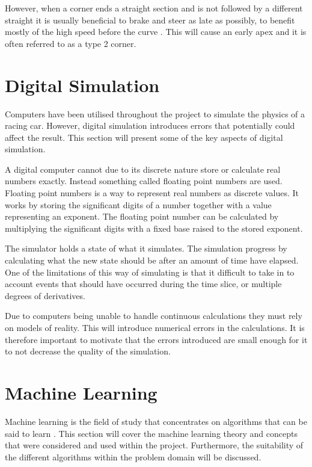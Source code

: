 However, when a corner ends a straight section and is not followed by a different straight it is usually beneficial to brake and steer as late as possibly, to benefit mostly of the high speed before the curve \cite{edmondson}. This will cause an early apex and it is often referred to as a type 2 corner.


\section{Digital Simulation}


Computers have been utilised throughout the project to simulate the physics of a racing car. However, digital simulation introduces errors that potentially could affect the result. This section will present some of the key aspects of digital simulation. 

A digital computer cannot due to its discrete nature store or calculate real numbers exactly. Instead something called floating point numbers are used. Floating point numbers is a way to represent real numbers as discrete values. It works by storing the significant digits of a number together with a value representing an exponent. The floating point number can be calculated by multiplying the significant digits with a fixed base raised to the stored exponent.

The simulator holds a state of what it simulates. The simulation progress by calculating what the new state should be after an amount of time have elapsed. One of the limitations of this way of simulating is that it difficult to take in to account events that should have occurred during the time slice, or multiple degrees of derivatives. 

Due to computers being unable to handle continuous calculations they must rely on models of reality. This will introduce numerical errors in the calculations. It is therefore important to motivate that the errors introduced are small enough for it to not decrease the quality of the simulation.



\section{Machine Learning}
Machine learning is the field of study that concentrates on algorithms that can be said to learn \cite{glossary}. This section will cover the machine learning theory and concepts that were considered and used within the project. Furthermore, the suitability of the different algorithms within the problem domain will be discussed.  

